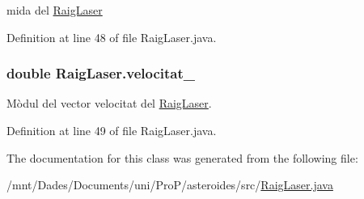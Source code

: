mida del \hyperlink{class_raig_laser}{Raig\+Laser} 



Definition at line 48 of file Raig\+Laser.\+java.

\hypertarget{class_raig_laser_af4bf8a2a716caaa467e7a01ca1566924}{}
\subsubsection[{velocitat\+\_\+}]{\setlength{\rightskip}{0pt plus 5cm}double Raig\+Laser.\+velocitat\+\_\+\hspace{0.3cm}{\ttfamily [private]}}\label{class_raig_laser_af4bf8a2a716caaa467e7a01ca1566924}


Mòdul del vector velocitat del \hyperlink{class_raig_laser}{Raig\+Laser}. 



Definition at line 49 of file Raig\+Laser.\+java.



The documentation for this class was generated from the following file\+:\begin{DoxyCompactItemize}
\item 
/mnt/\+Dades/\+Documents/uni/\+Pro\+P/asteroides/src/\hyperlink{_raig_laser_8java}{Raig\+Laser.\+java}\end{DoxyCompactItemize}
